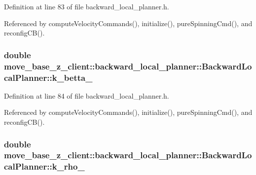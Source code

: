 Definition at line 83 of file backward\+\_\+local\+\_\+planner.\+h.



Referenced by compute\+Velocity\+Commands(), initialize(), pure\+Spinning\+Cmd(), and reconfig\+C\+B().

\subsubsection[{\texorpdfstring{k\+\_\+betta\+\_\+}{k_betta_}}]{\setlength{\rightskip}{0pt plus 5cm}double move\+\_\+base\+\_\+z\+\_\+client\+::backward\+\_\+local\+\_\+planner\+::\+Backward\+Local\+Planner\+::k\+\_\+betta\+\_\+\hspace{0.3cm}{\ttfamily [private]}}\hypertarget{classmove__base__z__client_1_1backward__local__planner_1_1BackwardLocalPlanner_aa2f7fe022cdc4eb11c17f6f576c732c6}{}\label{classmove__base__z__client_1_1backward__local__planner_1_1BackwardLocalPlanner_aa2f7fe022cdc4eb11c17f6f576c732c6}


Definition at line 84 of file backward\+\_\+local\+\_\+planner.\+h.



Referenced by compute\+Velocity\+Commands(), initialize(), pure\+Spinning\+Cmd(), and reconfig\+C\+B().

\subsubsection[{\texorpdfstring{k\+\_\+rho\+\_\+}{k_rho_}}]{\setlength{\rightskip}{0pt plus 5cm}double move\+\_\+base\+\_\+z\+\_\+client\+::backward\+\_\+local\+\_\+planner\+::\+Backward\+Local\+Planner\+::k\+\_\+rho\+\_\+\hspace{0.3cm}{\ttfamily [private]}}\hypertarget{classmove__base__z__client_1_1backward__local__planner_1_1BackwardLocalPlanner_a9ae9a8c4c4663a999ba107aea9f6868d}{}\label{classmove__base__z__client_1_1backward__local__planner_1_1BackwardLocalPlanner_a9ae9a8c4c4663a999ba107aea9f6868d}



